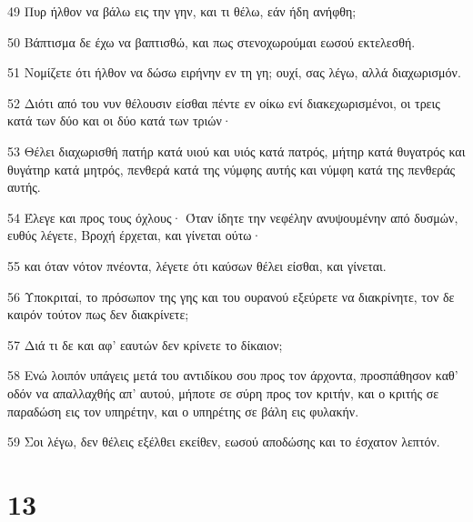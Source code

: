 \par 49 Πυρ ήλθον να βάλω εις την γην, και τι θέλω, εάν ήδη ανήφθη;
\par 50 Βάπτισμα δε έχω να βαπτισθώ, και πως στενοχωρούμαι εωσού εκτελεσθή.
\par 51 Νομίζετε ότι ήλθον να δώσω ειρήνην εν τη γη; ουχί, σας λέγω, αλλά διαχωρισμόν.
\par 52 Διότι από του νυν θέλουσιν είσθαι πέντε εν οίκω ενί διακεχωρισμένοι, οι τρεις κατά των δύο και οι δύο κατά των τριών·
\par 53 Θέλει διαχωρισθή πατήρ κατά υιού και υιός κατά πατρός, μήτηρ κατά θυγατρός και θυγάτηρ κατά μητρός, πενθερά κατά της νύμφης αυτής και νύμφη κατά της πενθεράς αυτής.
\par 54 Έλεγε και προς τους όχλους· Όταν ίδητε την νεφέλην ανυψουμένην από δυσμών, ευθύς λέγετε, Βροχή έρχεται, και γίνεται ούτω·
\par 55 και όταν νότον πνέοντα, λέγετε ότι καύσων θέλει είσθαι, και γίνεται.
\par 56 Υποκριταί, το πρόσωπον της γης και του ουρανού εξεύρετε να διακρίνητε, τον δε καιρόν τούτον πως δεν διακρίνετε;
\par 57 Διά τι δε και αφ' εαυτών δεν κρίνετε το δίκαιον;
\par 58 Ενώ λοιπόν υπάγεις μετά του αντιδίκου σου προς τον άρχοντα, προσπάθησον καθ' οδόν να απαλλαχθής απ' αυτού, μήποτε σε σύρη προς τον κριτήν, και ο κριτής σε παραδώση εις τον υπηρέτην, και ο υπηρέτης σε βάλη εις φυλακήν.
\par 59 Σοι λέγω, δεν θέλεις εξέλθει εκείθεν, εωσού αποδώσης και το έσχατον λεπτόν.

\chapter{13}

